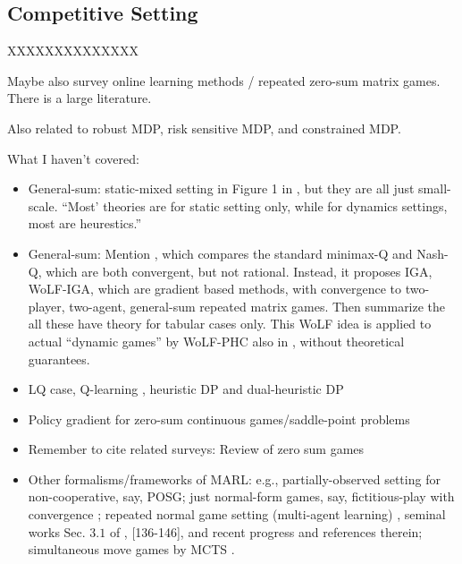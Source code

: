  
 
\subsection{Competitive Setting}

\iffalse
XXXXXXXXXXXXXX

Maybe also survey online learning methods / repeated zero-sum matrix games. There is a large literature. 

Also related to robust MDP, risk sensitive MDP, and constrained MDP. 

{\color{red} What I haven't covered: 

\begin{itemize}
\item General-sum: static-mixed setting in Figure 1 in \cite{bu2008comprehensive}, but they are all just small-scale. ``Most' theories are for static setting only, while for dynamics settings, most are heurestics.''
\item General-sum: Mention \cite{bowling2002multiagent}, which compares the standard minimax-Q and Nash-Q, which are both convergent, but not rational. Instead, it proposes IGA, WoLF-IGA, which are gradient based methods, with convergence to two-player, two-agent, general-sum repeated matrix games.  
Then summarize the all these have theory for tabular cases only. This WoLF idea is applied to actual ``dynamic games'' by WoLF-PHC also in  \cite{bowling2002multiagent}, without theoretical guarantees.
\item LQ case,  Q-learning  \cite{al2007model},  heuristic DP and dual-heuristic DP \cite{al2007adaptive}
\item Policy gradient for zero-sum continuous games/saddle-point problems  \cite{mazumdar2019finding,jin2019minmax,zhang2019policyb}
\item {Remember to cite related surveys}: Review of zero sum games \cite{bovsansky2016algorithms}
\end{itemize}


\begin{itemize}
	\item Other formalisms/frameworks of MARL: e.g., partially-observed setting for non-cooperative, say,  POSG; just normal-form games, say, fictitious-play with convergence \cite{hofbauer2002global}; 
repeated normal game setting (multi-agent learning)  \cite{claus1998dynamics,bowling2002multiagent,conitzer2007awesome,banerjee2003adaptive,singh2000nash,bowling2005convergence,chakraborty2014multiagent}, seminal works Sec. $3.1$ of \cite{hernandez2018multiagent}, [136-146], and recent progress \cite{song2019convergence} and references therein; simultaneous move games by MCTS \cite{lisy2013convergence}. 
\end{itemize}

}

